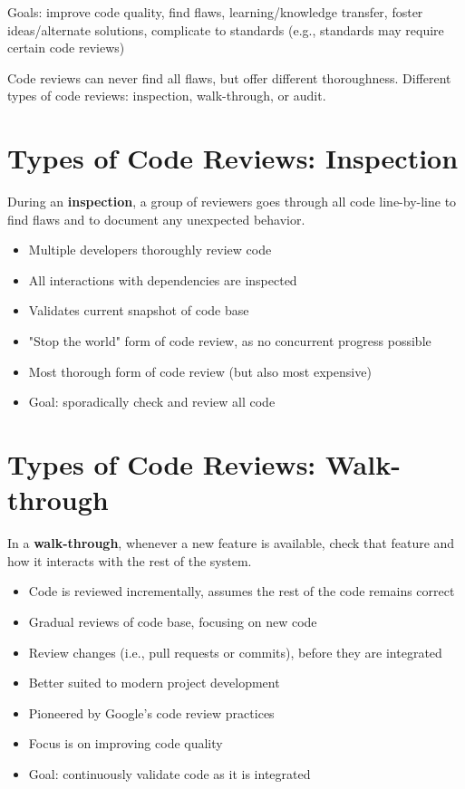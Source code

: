 \documentclass[11pt]{article}
\begin{document}
Goals: improve code quality, find flaws, learning/knowledge transfer, foster ideas/alternate solutions, complicate to standards (e.g., standards may require certain code reviews)

Code reviews can never find all flaws, but offer different thoroughness. Different types of code reviews: inspection, walk-through, or audit.

\section*{Types of Code Reviews: Inspection}

During an \textbf{inspection}, a group of reviewers goes through all code line-by-line to find flaws and to document any unexpected behavior. 
\begin{itemize}
	\item Multiple developers thoroughly review code
	\item All interactions with dependencies are inspected
	\item Validates current snapshot of code base
	\item "Stop the world" form of code review, as no concurrent progress possible
	\item Most thorough form of code review (but also most expensive)
	\item Goal: sporadically check and review all code
\end{itemize}

\section*{Types of Code Reviews: Walk-through}

In a \textbf{walk-through}, whenever a new feature is available, check that feature and how it interacts with the rest of the system. 
\begin{itemize}
	\item Code is reviewed incrementally, assumes the rest of the code remains correct
	\item Gradual reviews of code base, focusing on new code
	\item Review changes (i.e., pull requests or commits), before they are integrated
	\item Better suited to modern project development
	\item Pioneered by Google's code review practices
	\item Focus is on improving code quality
	\item Goal: continuously validate code as it is integrated
\end{itemize}
\end{document}
